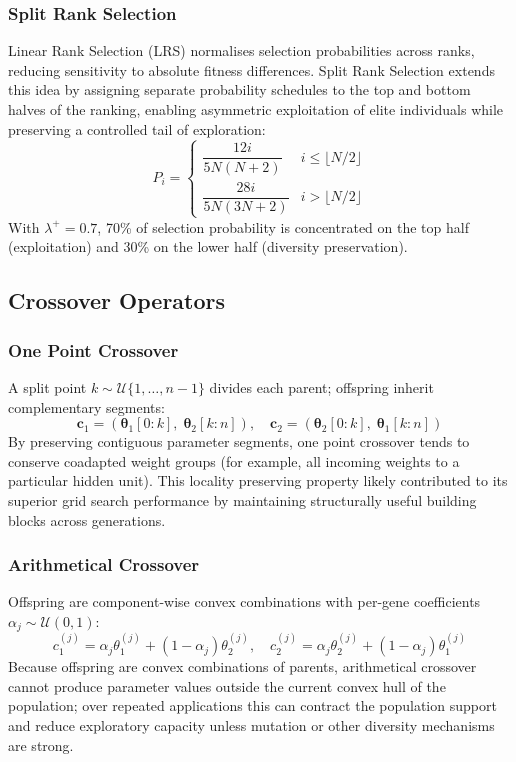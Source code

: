 \documentclass[12pt, a4paper]{article}
\begin{document}
\subsubsection{Split Rank Selection}
Linear Rank Selection (LRS) normalises selection probabilities across ranks, reducing sensitivity to absolute fitness differences. Split Rank Selection \cite{splitrank} extends this idea by assigning separate probability schedules to the top and bottom halves of the ranking, enabling asymmetric exploitation of elite individuals while preserving a controlled tail of exploration:
\[
P_i = \begin{cases} \dfrac{12i}{5N(N+2)} & i \leq \lfloor N/2 \rfloor \\[8pt] \dfrac{28i}{5N(3N+2)} & i > \lfloor N/2 \rfloor \end{cases}
\]
With $\lambda^+=0.7$, 70\% of selection probability is concentrated on the top half (exploitation) and 30\% on the lower half (diversity preservation).

\subsection{Crossover Operators}

\subsubsection{One Point Crossover}
A split point $k \sim \mathcal{U}\{1,\ldots,n{-}1\}$ divides each parent; offspring inherit complementary segments:
\[
\mathbf{c}_1 = (\boldsymbol{\theta}_1[0:k],\;\boldsymbol{\theta}_2[k:n]), \quad \mathbf{c}_2 = (\boldsymbol{\theta}_2[0:k],\;\boldsymbol{\theta}_1[k:n])
\]
By preserving contiguous parameter segments, one point crossover tends to conserve coadapted weight groups (for example, all incoming weights to a particular hidden unit). This locality preserving property likely contributed to its superior grid search performance by maintaining structurally useful building blocks across generations.

\subsubsection{Arithmetical Crossover}
Offspring are component-wise convex combinations with per-gene coefficients $\alpha_j \sim \mathcal{U}(0,1)$:
\[
c_1^{(j)} = \alpha_j\theta_1^{(j)} + (1{-}\alpha_j)\theta_2^{(j)}, \quad c_2^{(j)} = \alpha_j\theta_2^{(j)} + (1{-}\alpha_j)\theta_1^{(j)}
\]
Because offspring are convex combinations of parents, arithmetical crossover cannot produce parameter values outside the current convex hull of the population; over repeated applications this can contract the population support and reduce exploratory capacity unless mutation or other diversity mechanisms are strong.
\end{document}
